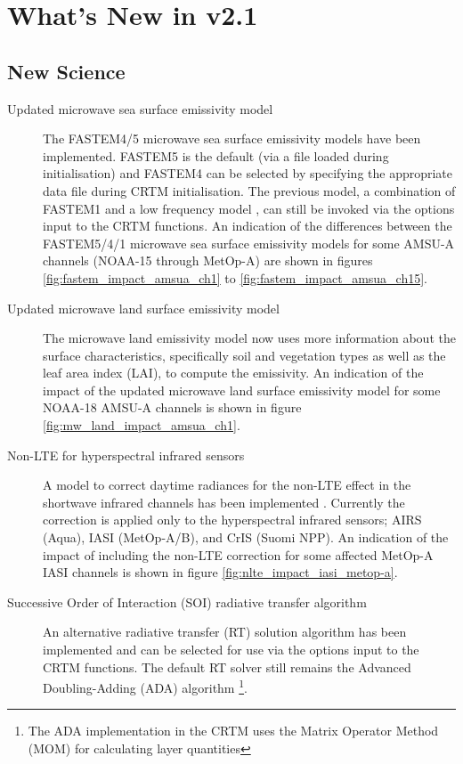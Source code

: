 \chapter*{What's New in v2.1}

\section*{New Science}

\begin{description}
\item[Updated microwave sea surface emissivity model] The FASTEM4/5 microwave sea surface emissivity models have been implemented. FASTEM5 is the default (via a file loaded during initialisation) and FASTEM4 \citep{QLiu_2011} can be selected by specifying the appropriate data file during CRTM initialisation. The previous model, a combination of FASTEM1 \citep{Fastem1} and a low frequency model \citep{Kazumori_2008}, can still be invoked via the options input to the CRTM functions. An indication of the differences between the FASTEM5/4/1 microwave sea surface emissivity models for some AMSU-A channels (NOAA-15 through MetOp-A) are shown in figures \ref{fig:fastem_impact_amsua_ch1} to \ref{fig:fastem_impact_amsua_ch15}.


\item[Updated microwave land surface emissivity model] The microwave land emissivity model now uses more information about the surface characteristics, specifically soil and vegetation types as well as the leaf area index (LAI), to compute the emissivity. An indication of the impact of the updated microwave land surface emissivity model for some NOAA-18 AMSU-A channels is shown in figure \ref{fig:mw_land_impact_amsua_ch1}.

 
\item[Non-LTE for hyperspectral infrared sensors] A model to correct daytime radiances for the non-LTE effect in the shortwave infrared channels has been implemented \citep{Chen_2012}. Currently the correction is applied only to the hyperspectral infrared sensors; AIRS (Aqua), IASI (MetOp-A/B), and CrIS (Suomi NPP). An indication of the impact of including the non-LTE correction for some affected MetOp-A IASI channels is shown in figure \ref{fig:nlte_impact_iasi_metop-a}.


\item[Successive Order of Interaction (SOI) radiative transfer algorithm] An alternative radiative transfer (RT) solution algorithm \citep{SOI_1} has been implemented and can be selected for use via the options input to the CRTM functions. The default RT solver still remains the Advanced Doubling-Adding (ADA) algorithm \citep{Liu_2006}\footnote{The ADA implementation in the CRTM uses the Matrix Operator Method (MOM) \citep{Liu_1996} for calculating layer quantities}.

\end{description}

